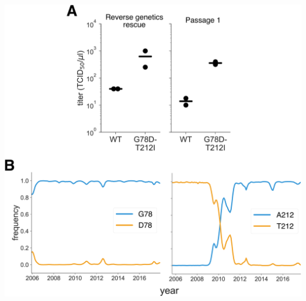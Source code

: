 \documentclass[11pt]{article}
\begin{document}
\begin{suppfigure}
\centerline{\includegraphics[width=\textwidth]{figs/S01_G78D-T212I/G78D-T212I.pdf}}
\caption{\label{suppfig:Perth2009_mut}
{\bf Characterization of the G78D-T212I Perth/2009 HA variant.} 
(A) 
The G78D-T212I Perth/2009 HA variant grows to higher titers than do viruses carrying the wildtype Perth/2009 HA.
Each virus was generated in duplicate by reverse genetics and passaged once at MOI = 0.01 in MDCK-SIAT1-TMPRSS2 cells.
The rescue and passage viral supernatants were titered, with the points marking each duplicate and the bar marking the mean.
(B)
The D78 variant remained at a low frequency in natural human H3N2 sequences over the past $~\sim$10 years.
The A212 variant rose to fixation in $~\sim$2011, replacing the T212 variant.
}
\end{suppfigure}
\end{document}
